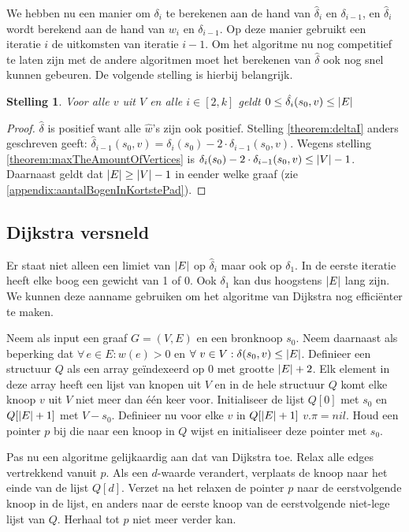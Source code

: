 \documentclass[conference]{IEEEtran}
\newtheorem{theorem}{Stelling}[section]
\theoremstyle{definition}
\DeclarePairedDelimiter{\card}{\vert}{\vert}  %
\let \oldforall \forall
\renewcommand{\forall}{\oldforall\,}
\begin{document}
We hebben nu een manier om $\delta_i$ te berekenen aan de hand van $\hat{\delta}_i$ en $\delta_{i-1}$, en $\hat{\delta}_i$ wordt berekend aan de hand van $w_i$ en $\delta_{i-1}$. Op deze manier gebruikt een iteratie $i$ de uitkomsten van iteratie $i-1$. Om het algoritme nu nog competitief te laten zijn met de andere algoritmen moet het berekenen van $\hat\delta$ ook nog snel kunnen gebeuren. De volgende stelling is hierbij belangrijk.

\begin{theorem}
    Voor alle $v$ uit $V$ en alle $i \in [2, k]$ geldt $0 \leq \hat{\delta_i}(s_0, v) \leq \card{E}$
\end{theorem}
\begin{proof}
    $\hat{\delta}$ is positief want alle $\hat{w}$'s zijn ook positief. Stelling \ref{theorem:deltaI} anders geschreven geeft: $\hat{\delta}_{i-1}(s_0, v) = \delta_i(s_0) - 2 \cdot \delta_{i-1}(s_0, v)$. Wegens stelling \ref{theorem:maxTheAmountOfVertices} is $\delta_i(s_0) - 2 \cdot \delta_{i-1}(s_0, v) \leq \card{V} -1$. Daarnaast geldt dat $\card{E} \geq \card{V} - 1$ in eender welke graaf (zie \ref{appendix:aantalBogenInKortstePad}).
\end{proof}

\subsection{Dijkstra versneld}
Er staat niet alleen een limiet van $\card{E}$ op $\hat{\delta}_i$ maar ook op $\delta_1$. In de eerste iteratie heeft elke boog een gewicht van 1 of 0. Ook $\delta_1$ kan dus hoogstens $\card{E}$ lang zijn. We kunnen deze aanname gebruiken om het algoritme van Dijkstra nog efficiënter te maken.

Neem als input een graaf $G = (V, E)$ en een bronknoop $s_0$. Neem daarnaast als beperking dat $\forall e \in E: w(e) > 0$ en $\forall v \in V: \delta(s_0, v) \leq \card{E}$. Definieer een structuur $Q$ als een array geïndexeerd op 0 met grootte $\card{E} + 2$. Elk element in deze array heeft een lijst van knopen uit $V$ en in de hele structuur $Q$ komt elke knoop $v$ uit $V$ niet meer dan één keer voor. Initialiseer de lijst $Q[0]$ met $s_0$ en $Q[\card{E} + 1]$ met $V - s_0$. Definieer nu voor elke $v$ in $Q[\card{E} + 1]$ $v.\pi = nil$. Houd een pointer $p$ bij die naar een knoop in $Q$ wijst en initialiseer deze pointer met $s_0$.

Pas nu een algoritme gelijkaardig aan dat van Dijkstra toe. Relax alle edges vertrekkend vanuit $p$. Als een $d$-waarde verandert, verplaats de knoop naar het einde van de lijst $Q[d]$. Verzet na het relaxen de pointer $p$ naar de eerstvolgende knoop in de lijst, en anders naar de eerste knoop van de eerstvolgende niet-lege lijst van $Q$. Herhaal tot $p$ niet meer verder kan.
\end{document}

